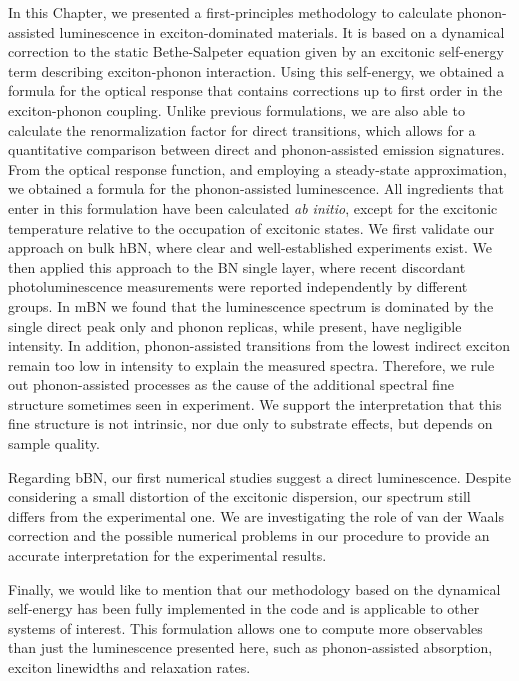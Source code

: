 In this Chapter, we presented a first-principles methodology to calculate phonon-assisted luminescence in exciton-dominated materials. It is based on a dynamical correction to the static Bethe-Salpeter equation given by an excitonic self-energy term describing exciton-phonon interaction. Using this self-energy, we obtained a formula for the optical response that contains corrections up to first order in the exciton-phonon coupling.
Unlike previous formulations, we are also able to calculate the renormalization factor for direct transitions, which allows for a quantitative comparison between direct and phonon-assisted emission signatures.
From the optical response function, and employing a steady-state approximation, we obtained a formula for the phonon-assisted luminescence. All ingredients that enter in this formulation have been calculated \emph{ab initio}, except for the excitonic temperature relative to the occupation of excitonic states.
We first validate our approach on bulk \acrshort{hBN}, where clear and well-established experiments exist. We then applied this approach to the BN single layer, where recent discordant photoluminescence measurements were reported independently by different groups. In mBN we found that the luminescence spectrum is dominated by the single direct peak only and phonon replicas, while present, have negligible intensity. In addition, 
phonon-assisted transitions from the lowest indirect exciton remain too low in intensity to explain the measured spectra. Therefore, we rule out phonon-assisted processes as the cause of the additional spectral fine structure sometimes seen in experiment.
We support the interpretation that this fine structure is not intrinsic, nor due only to substrate effects, but depends on sample quality.

Regarding \acrshort{bBN}, our first numerical studies suggest a direct luminescence. Despite considering a small distortion of the excitonic dispersion, our spectrum still differs from the experimental one. We are investigating the role of van der Waals correction and the possible numerical problems in our procedure to provide an accurate interpretation for the experimental results.

Finally, we would like to mention that our methodology based on the dynamical self-energy has been fully implemented in the \yambo code and is applicable to other systems of interest. This formulation allows one to compute more observables than just the luminescence presented here, such as phonon-assisted absorption, exciton linewidths and relaxation rates.
